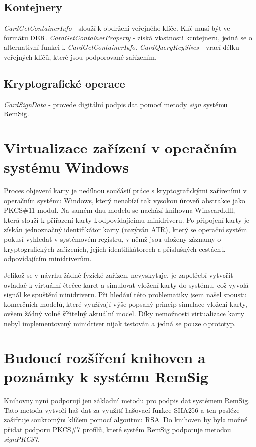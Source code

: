 \documentclass[]{fithesis3}
\begin{document}
		\subsection{Kontejnery}
		\textit{CardGetContainerInfo} - slouží k obdržení veřejného klíče. Klíč musí být 			ve formátu DER.
		\newline
 		\newline
		\textit{CardGetContainerProperty} - získá vlastnosti kontejneru, jedná se o alternativní 			funkci k \textit{CardGetContainerInfo}.
		\newline
		\newline
		\textit{CardQueryKeySizes} - vrací délku veřejných klíčů, které jsou podporované 				zařízením.

		\subsection{Kryptografické operace}
		\textit{CardSignData} - provede digitální podpis dat pomocí metody  \textit{sign} systému 			RemSig. 

	\section{Virtualizace zařízení v operačním systému Windows}
	
	Proces objevení karty je nedílnou součástí práce s kryptografickými zařízeními v operačním 			systému Windows, který nenabízí tak vysokou úroveň abstrakce jako PKCS\#11 modul. Na 		samém dnu modelu se nachází knihovna Winscard.dll, která slouží k přiřazení karty k\,odpovídajícímu minidriveru. Po připojení karty je získán jednoznačný identifikátor karty (nazýván 		ATR), který se operační systém pokusí vyhledat v systémovém registru, v němž jsou uloženy 		záznamy o kryptografických zařízeních, jejich identifikátorech a příslušných cestách\,k 				odpovídajícím minidriverům.

	Jelikož se v návrhu žádné fyzické zařízení nevyskytuje, je zapotřebí vytvořit ovladač k virtuální 		čtečce karet a simulovat vložení karty do systému, což vyvolá signál ke spuštění minidriveru. Při 	hledání této problematiky jsem našel spoustu komerčních modelů, které využívají výše 			popsaný princip simulace vložení karty, ovšem žádný volně šířitelný aktuální model. Díky 			nemožnosti virtualizace karty nebyl implementovaný minidriver nijak testován a jedná se pouze 		o\,prototyp.

	\section{Budoucí rozšíření knihoven a poznámky k systému RemSig}
	Knihovny nyní podporují jen základní metodu pro podpis dat systémem RemSig. Tato metoda 		vytvoří haš dat za využití hašovací funkce SHA256 a ten posléze zašifruje soukromým klíčem 		pomocí algoritmu RSA. Do knihoven by bylo možné přidat podporu PKCS\#7 profilů, které 			systém RemSig podporuje metodou \textit{signPKCS7}.  \newline
\end{document}
